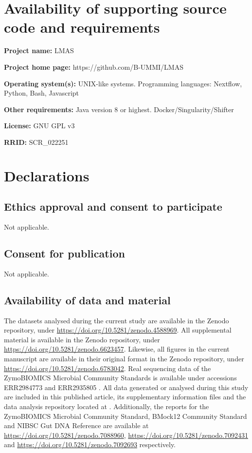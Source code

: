 \section{Availability of supporting source code and requirements}

\textbf{Project name:} LMAS

\textbf{Project home page: }https://github.com/B-UMMI/LMAS 

\textbf{Operating system(s):} UNIX-like systems.
Programming languages: Nextflow, Python, Bash, Javascript

\textbf{Other requirements: }Java version 8 or highest. Docker/Singularity/Shifter

\textbf{License: } GNU GPL v3

\textbf{RRID:} SCR\_022251


\section{Declarations}

\subsection{Ethics approval and consent to participate}

Not applicable.

\subsection{Consent for publication}

Not applicable.

\subsection{Availability of data and material}

The datasets analysed during the current study are available in the Zenodo repository, under \url{https://doi.org/10.5281/zenodo.4588969}. All supplemental material is available in the Zenodo repository, under \url{https://doi.org/10.5281/zenodo.6623457}. Likewise, all figures in the current manuscript are available in their original format in the Zenodo repository, under \url{https://doi.org/10.5281/zenodo.6783042}. Real sequencing data of the ZymoBIOMICS Microbial Community Standards is available under accessions ERR2984773 and ERR2935805 \cite{nicholls_ultra-deep_2019}. All data generated or analysed during this study are included in this published article, its supplementary information files and the data analysis repository located at \cite{noauthor_lmas_2022}. Additionally, the reports for the ZymoBIOMICS Microbial Community Standard, BMock12 Community Standard and NIBSC Gut DNA Reference are available at \url{https://doi.org/10.5281/zenodo.7088960}, \url{https://doi.org/10.5281/zenodo.7092431} and \url{https://doi.org/10.5281/zenodo.7092693} respectively.

